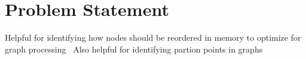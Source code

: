 \section{Problem Statement}
\label{section:51-CD-Problem-Statement}

Helpful for identifying how nodes should be reordered in memory to optimize for graph processing~\cite{Balaji2018}
Also helpful for identifying partion points in graphs